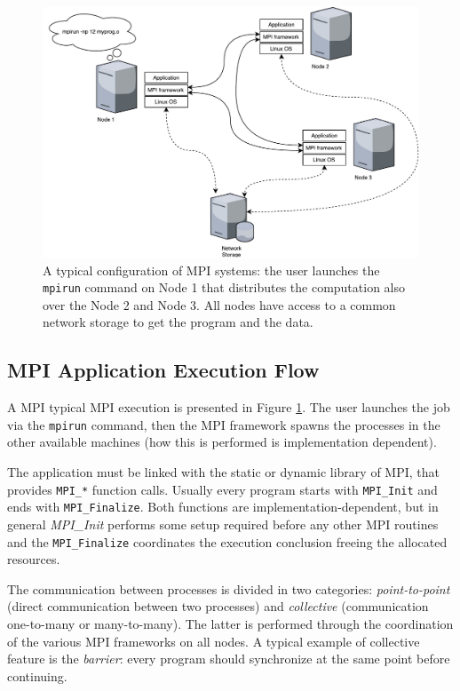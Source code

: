 \begin{figure}[t]
		\centerline 
{\includegraphics[scale=0.5]{img/cap1-mpiarchitecture.pdf}}
		\caption[MPI systems typical setup] {A typical configuration of MPI systems: the user launches the
		\texttt{mpirun} command on Node 1 that distributes the computation
		also over the Node 2 and Node 3. All nodes have access to a common 
		network storage to get the program and the data.}
		\label{fig:cap1-mpiarchitecture}
\end{figure}


\subsection{MPI Application Execution Flow}
A MPI typical MPI execution is presented in Figure 
\ref{fig:cap1-mpiarchitecture}. The user launches the job via the
\texttt{mpirun} command, then the MPI framework spawns the processes
in the other available machines (how this is performed is implementation
dependent).

The application must be linked with the static or dynamic library of MPI,
that provides \texttt{MPI\_*} function calls. Usually every program starts
with \texttt{MPI\_Init} and ends with \texttt{MPI\_Finalize}. Both functions
are implementation-dependent, but in general \emph{MPI\_Init} performs some
setup required before any other MPI routines and the
\texttt{MPI\_Finalize} coordinates the execution conclusion freeing the
allocated resources.

The communication between processes is divided in two categories:
\emph{point-to-point} (direct communication between two processes) and
\emph{collective}
(communication one-to-many or many-to-many). The latter is performed through
the coordination of the various MPI frameworks on all nodes. A typical example
of collective feature is the \emph{barrier}: every program should synchronize
at the same point before continuing.

